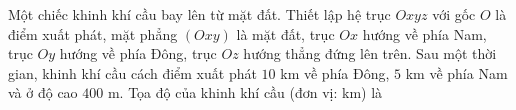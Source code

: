 \begin{ex}
Một chiếc khinh khí cầu bay lên từ mặt đất. Thiết lập hệ trục $Oxyz$ với gốc $O$ là điểm xuất phát, mặt phẳng $(Oxy)$ là mặt đất, trục $Ox$ hướng về phía Nam, trục $Oy$ hướng về phía Đông, trục $Oz$ hướng thẳng đứng lên trên. Sau một thời gian, khinh khí cầu cách điểm xuất phát $10$ km về phía Đông, $5$ km về phía Nam và ở độ cao $400$ m. Tọa độ của khinh khí cầu (đơn vị: km) là
\end{ex}
